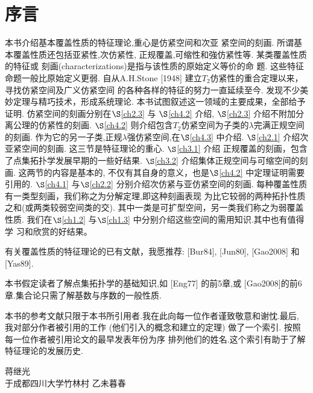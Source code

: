 \chapter*{序\quad 言}

\setcounter{page}{1}
\thispagestyle{empty}

本书介绍基本覆盖性质的特征理论,重心是仿紧空间和次亚
紧空间的刻画.
所谓基本覆盖性质还包括亚紧性,次仿紧性,
正规覆盖,可缩性和強仿紧性等.
某类覆盖性质的特征或
刻画(characterizations)是指与该性质的原始定义等价的命
题.
这些特征命题一般比原始定义更弱.
自从A.H.Stone [1948]
建立$T_2$仿紧性的重合定理以来，寻找仿紧空间及广义仿紧空间
的各种各样的特征的努力一直延续至今.
发现不少美妙定理与精巧技术，形成系统理论.
本书试图叙述这一领域的主要成果，全部给予证明.
仿紧空间的刻画分别在$\S$\ref{ch2.3} 与
$\S$\ref{ch4.2} 介绍, $\S$\ref{ch2.3} 介绍不附加分离公理的仿紧性的刻画.
$\S$\ref{ch4.2} 则介绍包含$T_2$仿紧空间为子类的$\lambda$完满正规空间的刻画.
作为它的另一子类,正规$\lambda$强仿紧空间,在$\S$\ref{ch4.3} 中介绍.
$\S$\ref{ch2.1} 介绍次亚紧空间的刻画.
这三节是特征理论的重心. $\S$\ref{ch3.1} 介绍
正规覆盖的刻画，包含了点集拓扑学发展早期的一些好结果.
$\S$\ref{ch3.2} 介绍集体正规空间与可缩空间的刻画.
这两节的内容是基本的, 不仅有其自身的意义，也是$\S$\ref{ch4.2} 中定理证明需要引用的.
$\S$\ref{ch4.1} 与$\S$\ref{ch2.2} 分别介绍次仿紧与亚仿紧空间的刻画.
每种覆盖性质有一类型刻画，我们称之为分解定理,即这种刻画表现
为比它较弱的两种拓扑性质之和(或两类较弱空间类的交).
其中一类是可扩型空间，另一类我们称之为弱覆盖性质.
我们在$\S$\ref{ch1.2} 与$\S$\ref{ch1.3} 中分别介绍这些空间的需用知识.其中也有值得学
习和欣赏的好结果。

有关覆盖性质的特征理论的已有文献，我愿推荐: [Bur84], [Jun80], [Gao2008] 和 [Yas89].

本书假定读者了解点集拓扑学的基础知识,如 [Eng77] 的前5章,或
[Gao2008]的前6章.集合论只需了解基数与序数的一般性质.

本书的参考文献只限于本书所引用者.我在此向每一位作者谨致敬意和谢忱.最后, 我对部分作者被引用的工作 (他们引入的概念和建立的定理) 做了一个索引.
按照每一位作者被引用论文的最早发表年份为序
排列他们的姓名.这个索引有助于了解特征理论的发展历史.

{\kaishu
	\begin{center}
		\hspace*{88mm}蒋继光\\
		\hspace{88mm}于成都四川大学竹林村
		\hspace*{88mm}乙未暮春
	\end{center}
}


